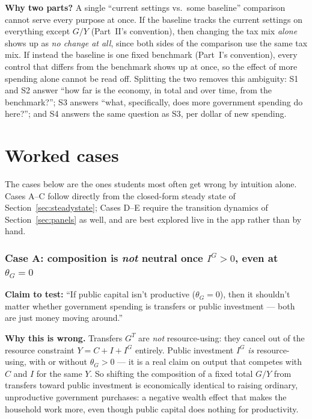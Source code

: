\documentclass[11pt]{article}
\begin{document}
\begin{notebox}
\textbf{Why two parts?} A single ``current settings vs.\ some baseline''
comparison cannot serve every purpose at once. If the baseline tracks the
current settings on everything except $G/Y$ (Part~II's convention), then
changing the tax mix \emph{alone} shows up as \emph{no change at all},
since both sides of the comparison use the same tax mix. If instead the
baseline is one fixed benchmark (Part~I's convention), every control that
differs from the benchmark shows up at once, so the effect of more
spending alone cannot be read off. Splitting the two removes this
ambiguity: S1 and S2 answer ``how far is the economy, in total and over
time, from the benchmark?''; S3 answers ``what, specifically, does more
government spending do here?''; and S4 answers the same question as S3,
per dollar of new spending.
\end{notebox}

\part{Worked cases}

The cases below are the ones students most often get wrong by intuition
alone. Cases A--C follow directly from the closed-form steady state of
Section~\ref{sec:steadystate}; Cases D--E require the transition dynamics
of Section~\ref{sec:panels} as well, and are best explored live in the
app rather than by hand.

\section{Case A: composition is \emph{not} neutral once $I^G>0$, even at $\theta_G=0$}
\label{sec:caseA}

\textbf{Claim to test:} ``If public capital isn't productive ($\theta_G=0$),
then it shouldn't matter whether government spending is transfers or public
investment --- both are just money moving around.''

\textbf{Why this is wrong.} Transfers $G^T$ are \emph{not} resource-using:
they cancel out of the resource constraint $Y=C+I+I^G$ entirely. Public
investment $I^G$ \emph{is} resource-using, with or without $\theta_G>0$ ---
it is a real claim on output that competes with $C$ and $I$ for the same
$Y$. So shifting the composition of a fixed total $G/Y$ from transfers
toward public investment is economically identical to raising ordinary,
unproductive government purchases: a negative wealth effect that makes the
household work more, even though public capital does nothing for
productivity.
\end{document}
